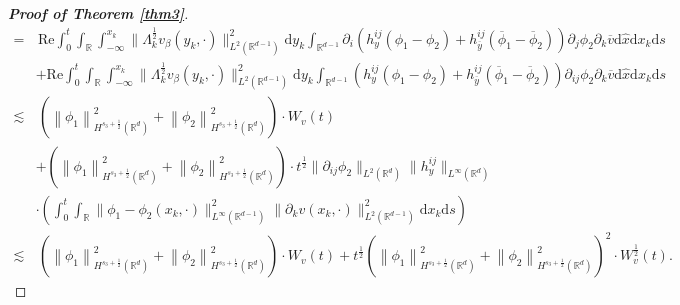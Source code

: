 \documentclass[10pt,twoside,a4paper]{article}
\numberwithin{equation}{section}\allowdisplaybreaks
\begin{document}
\begin{proof}[\textbf{Proof of Theorem \ref{thm3}}]
\begin{align}
	 	=&\,\mathrm{Re}  \int_0^t \int_{\mathbb{R}} \int_{-\infty}^{x_k} \|\Lambda_k^{\frac 12}v_{\beta}(y_k,\cdot)\|^2_{L^2(\mathbb{R}^{d-1})} \mathrm{d} y_k	\int_{\mathbb{R}^{d-1}} \partial_i\left( h^{ij}_y  \left(\phi_1 -  \phi_2 \right)+h^{ij}_{\overline{y}} (\overline{\phi}_1-\overline{\phi}_2)\right) \partial_j\phi_2\partial_k \overline{v}  \mathrm{d} \hat{x}  \mathrm{d} x_k \mathrm{d}s \nonumber\\
	 	&+ \mathrm{Re}\int_0^t \int_{\mathbb{R}}  \int_{-\infty}^{x_k} \|\Lambda_k^{\frac 12}v_{\beta}(y_k,\cdot)\|^2_{L^2(\mathbb{R}^{d-1})} \mathrm{d} y_k	\int_{\mathbb{R}^{d-1}}   \left( h^{ij}_y  \left(\phi_1 -  \phi_2 \right)+h^{ij}_{\overline{y}} (\overline{\phi}_1-\overline{\phi}_2)\right)\partial_{ij}\phi_2\partial_k \overline{v}   \mathrm{d} \hat{x}  \mathrm{d} x_k \mathrm{d}s\nonumber \\
	 	\lesssim &\,\left( \left\|  \phi_1\right\|_{H^{s_3+\frac 12}(\mathbb{R}^d)}^2 + \left\|  \phi_2\right\|_{H^{s_3+\frac 12}(\mathbb{R}^d)}^2 \right) \cdot W_v(t)\\
	 	&+ \left( \left\|  \phi_1\right\|_{H^{s_3+\frac 12}(\mathbb{R}^d)}^2 + \left\|  \phi_2\right\|_{H^{s_3+\frac 12}(\mathbb{R}^d)}^2 \right) \cdot t^{\frac 12}\| \partial_{ij}\phi_2\|_{L^2(\mathbb{R}^d)} \|h^{ij}_y\|_{L^{\infty}(\mathbb{R}^d)} \nonumber\\
	 	&\cdot\left(\int_0^t \int_{\mathbb{R}}    \|\phi_1 -  \phi_2 (x_k,\cdot)\|_{L^\infty(\mathbb{R}^{d-1})}^2   \|\partial_k v (x_k,\cdot)\|_{L^2(\mathbb{R}^{d-1})}^2 \mathrm{d} x_k \mathrm{d} s  \right)\nonumber\\
	 	\lesssim &\,\left( \left\|  \phi_1\right\|_{H^{s_3+\frac 12}(\mathbb{R}^d)}^2 + \left\|  \phi_2\right\|_{H^{s_3+\frac 12}(\mathbb{R}^d)}^2 \right) \cdot W_v(t)+t^{\frac 12}\left( \left\|  \phi_1\right\|_{H^{s_3+\frac 12}(\mathbb{R}^d)}^2 + \left\|  \phi_2\right\|_{H^{s_3+\frac 12}(\mathbb{R}^d)}^2 \right)^2 \cdot W_v^{\frac 12}(t).\nonumber
	 \end{align}		
\end{proof}	
\end{document}
